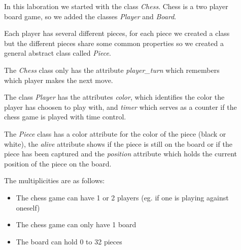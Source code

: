 \documentclass[11pt,a4paper]{article}
\begin{document}
\begin{description}
    \item[]
    In this laboration we started with the class \emph{Chess}.
    Chess is a two player board game, so we added the 
    classes \emph{Player} and \emph{Board}.
    \item[]
    Each player has several different pieces, for each piece we created a class
    but the different pieces share some common properties so we created a general abstract class
    called \emph{Piece}. 
    \item[]
    The \emph{Chess} class only has the attribute \emph{player\_turn} which 
    remembers which player makes the next move.
    \item[]
    The class \emph{Player} has the attributes \emph{color}, which identifies
    the color the player has choosen to play with, and \emph{timer} which serves as a
    counter if the chess game is played with time control.
    \item[]
    The \emph{Piece} class has a color attribute for the color of the piece (black or white),
    the \emph{alive} attribute shows if the piece is still on the board or if the piece
    has been captured and the \emph{position} attribute which holds the current position of
    the piece on the board.
    \item[]
        The multiplicities are as follows:
        \begin{itemize}
            \item The chess game can have 1 or 2 players (eg. if one is playing against oneself)
            \item The chess game can only have 1 board
            \item The board can hold 0 to 32 pieces
        \end{itemize}
\end{description}
\end{document}
